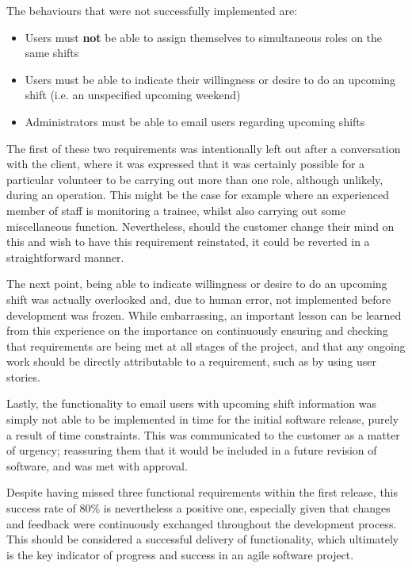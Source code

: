 The behaviours that were not successfully implemented are:

\begin{itemize}
    \item Users must \textbf{not} be able to assign themselves to simultaneous roles on the same shifts
    \item Users must be able to indicate their willingness or desire to do an upcoming shift (i.e. an unspecified upcoming weekend)
    \item Administrators must be able to email users regarding upcoming shifts
\end{itemize}

The first of these two requirements was intentionally left out after a conversation with the client, where it was expressed that it was certainly possible for a particular volunteer to be carrying out more than one role, although unlikely, during an operation. This might be the case for example where an experienced member of staff is monitoring a trainee, whilst also carrying out some miscellaneous function. Nevertheless, should the customer change their mind on this and wish to have this requirement reinstated, it could be reverted in a straightforward manner.

The next point, being able to indicate willingness or desire to do an upcoming shift was actually overlooked and, due to human error, not implemented before development was frozen. While embarrassing, an important lesson can be learned from this experience on the importance on continuously ensuring and checking that requirements are being met at all stages of the project, and that any ongoing work should be directly attributable to a requirement, such as by using user stories. 

Lastly, the functionality to email users with upcoming shift information was simply not able to be implemented in time for the initial software release, purely a result of time constraints. This was communicated to the customer as a matter of urgency; reassuring them that it would be included in a future revision of software, and was met with approval.

Despite having missed three functional requirements within the first release, this success rate of 80\% is nevertheless a positive one, especially given that changes and feedback were continuously exchanged throughout the development process. This should be considered a successful delivery of functionality, which ultimately is the key indicator of progress and success in an agile software project. \cite{beck2001agile}

